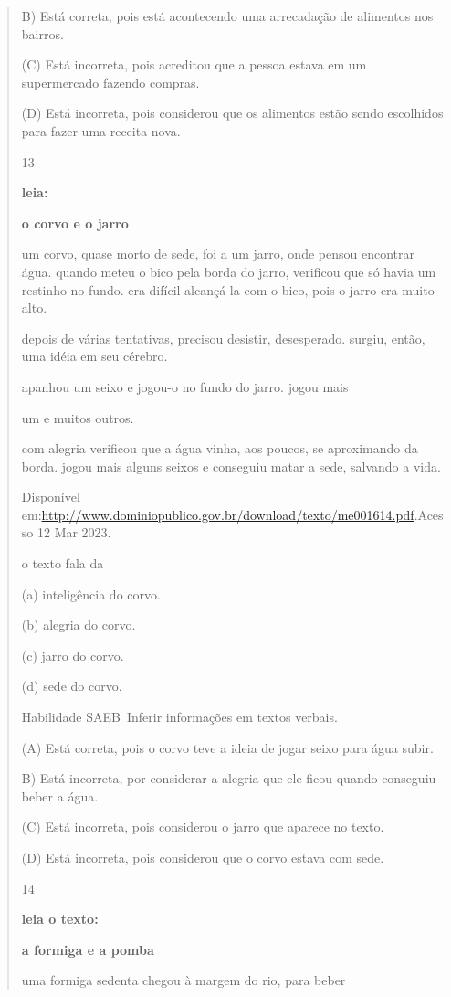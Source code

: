 \begin{verse}
{{{{{{{{{{{{{{{{{{{{B) Está correta, pois está acontecendo uma arrecadação de alimentos nos
bairros.

(C) Está incorreta, pois acreditou que a pessoa estava em um
supermercado fazendo compras.

(D) Está incorreta, pois considerou que os alimentos estão sendo
escolhidos para fazer uma receita nova.

\num{13}

\textbf{leia:}

\textbf{o corvo e o jarro}

um corvo, quase morto de sede, foi a um jarro, onde pensou encontrar
água. quando meteu o bico pela borda do jarro, verificou que só havia um
restinho no fundo. era difícil alcançá-la com o bico, pois o jarro era
muito alto.

depois de várias tentativas, precisou desistir, desesperado. surgiu,
então, uma idéia em seu cérebro.

apanhou um seixo e jogou-o no fundo do jarro. jogou mais

um e muitos outros.

com alegria verificou que a água vinha, aos poucos, se aproximando da
borda. jogou mais alguns seixos e conseguiu matar a sede, salvando a
vida.

Disponível
em:\url{http://www.dominiopublico.gov.br/download/texto/me001614.pdf}.Acesso
12 Mar 2023.

o texto fala da

(a) inteligência do corvo.

(b) alegria do corvo.

(c) jarro do corvo.

(d) sede do corvo.

Habilidade SAEB~Inferir informações em textos verbais.

\protect\hypertarget{_Hlk129586281}{}{}(\protect\hypertarget{_Hlk129420306}{}{}A)
Está correta, pois o corvo teve a ideia de jogar seixo para água subir.

B) Está incorreta, por considerar a alegria que ele ficou quando
conseguiu beber a água.

(C) Está incorreta, pois considerou o jarro que aparece no texto.

(D) Está incorreta, pois considerou que o corvo estava com sede.

\num{14}

\textbf{leia o texto:}

\textbf{a formiga e a pomba}

uma formiga sedenta chegou à margem do rio, para beber

}}}}}}}}}}}}}}}}}}}}
\end{verse}
